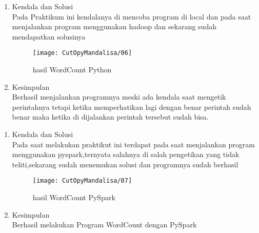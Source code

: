 \begin{enumerate}
\item Kendala dan Solusi\\
Pada Praktikum ini kendalanya di mencoba program di local dan pada saat menjalankan program menggunakan hadoop dan sekarang sudah mendapatkan solusinya

\begin{figure}[!ht]
\texttt{[image: CutOpyMandalisa/06]}
\caption{hasil WordCount Python}
\label{gam:perkuliahan-16-12}
\end{figure}

\item Kesimpulan\\
Berhasil menjalankan programnya meski ada kendala saat mengetik perintahnya tetapi ketika memperhatikan lagi dengan benar perintah sudah benar maka ketika di dijalankan perintah tersebut sudah bisa.
\end{enumerate}

\begin{enumerate}
\item Kendala dan Solusi\\
Pada saat melakukan praktikut ini terdapat pada saat menjalankan program menggunakan pyspark,ternyata salahnya di salah pengetikan yang tidak teliti,sekarang sudah menemukan solusi dan programnya sudah berhasil

\begin{figure}[!ht]
\texttt{[image: CutOpyMandalisa/07]}
\caption{hasil WordCount PySpark }
\label{gam:perkuliahan-22-12}
\end{figure}

\item Kesimpulan\\
Berhasil melakukan Program WordCount dengan PySpark
\end{enumerate}

